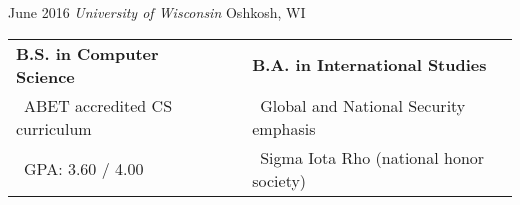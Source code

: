 \cventry
    {June 2016}
    {\textnormal{\textit{University of Wisconsin}}}
    {}
    {Oshkosh, WI}
    {}
    {\begin{tabular}{lcl}
        \textbf{B.S. in Computer Science} & \hspace{3em} & \textbf{B.A. in International Studies}\\
        \ ABET accredited CS curriculum & & \ Global and National Security
        emphasis\\
        \ GPA: 3.60 / 4.00 & & \ Sigma Iota Rho (national honor society)
    \end{tabular}}
